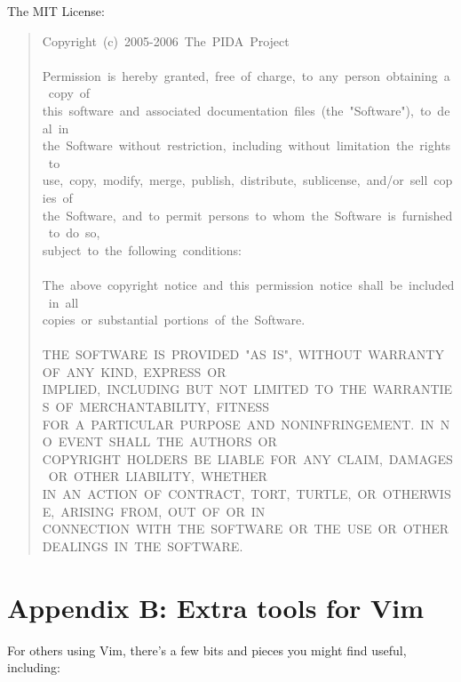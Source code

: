 \documentclass[10pt,a4paper,english]{article}
\begin{document}
The MIT License:
\begin{quote}{\ttfamily \raggedright \noindent
Copyright~(c)~2005-2006~The~PIDA~Project~\\
~\\
Permission~is~hereby~granted,~free~of~charge,~to~any~person~obtaining~a~copy~of~\\
this~software~and~associated~documentation~files~(the~"Software"),~to~deal~in~\\
the~Software~without~restriction,~including~without~limitation~the~rights~to~\\
use,~copy,~modify,~merge,~publish,~distribute,~sublicense,~and/or~sell~copies~of~\\
the~Software,~and~to~permit~persons~to~whom~the~Software~is~furnished~to~do~so,~\\
subject~to~the~following~conditions:~\\
~\\
The~above~copyright~notice~and~this~permission~notice~shall~be~included~in~all~\\
copies~or~substantial~portions~of~the~Software.~\\
~\\
THE~SOFTWARE~IS~PROVIDED~"AS~IS",~WITHOUT~WARRANTY~OF~ANY~KIND,~EXPRESS~OR~\\
IMPLIED,~INCLUDING~BUT~NOT~LIMITED~TO~THE~WARRANTIES~OF~MERCHANTABILITY,~FITNESS~\\
FOR~A~PARTICULAR~PURPOSE~AND~NONINFRINGEMENT.~IN~NO~EVENT~SHALL~THE~AUTHORS~OR~\\
COPYRIGHT~HOLDERS~BE~LIABLE~FOR~ANY~CLAIM,~DAMAGES~OR~OTHER~LIABILITY,~WHETHER~\\
IN~AN~ACTION~OF~CONTRACT,~TORT,~TURTLE,~OR~OTHERWISE,~ARISING~FROM,~OUT~OF~OR~IN~\\
CONNECTION~WITH~THE~SOFTWARE~OR~THE~USE~OR~OTHER~DEALINGS~IN~THE~SOFTWARE.
}\end{quote}



\hypertarget{appendix-b-extra-tools-for-vim}{}
\section*{Appendix B: Extra tools for Vim}

For others using Vim, there's a few bits and pieces you might find useful, including:
\end{document}
